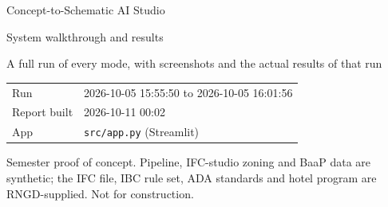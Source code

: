 \documentclass[10pt]{article}
\begin{document}
\begin{titlepage}\centering
{}\par\vspace{0.6cm}
{\LARGE Concept-to-Schematic AI Studio}\par\vspace{0.3cm}
{\Large System walkthrough and results}\par\vspace{1cm}
{\large A full run of every mode, with screenshots and the actual results of that run}\par\vspace{2cm}
\begin{tabular}{ll}Run & 2026-10-05 15:55:50 to 2026-10-05 16:01:56 \\
Report built & 2026-10-11 00:02 \\ App & \texttt{src/app.py} (Streamlit) \\\end{tabular}
\vfill{\small\color{fail} Semester proof of concept. Pipeline, IFC-studio zoning and BaaP data are synthetic; the
IFC file, IBC rule set, ADA standards and hotel program are RNGD-supplied. Not for construction.}
\end{titlepage}
\tableofcontents\newpage
\end{document}
